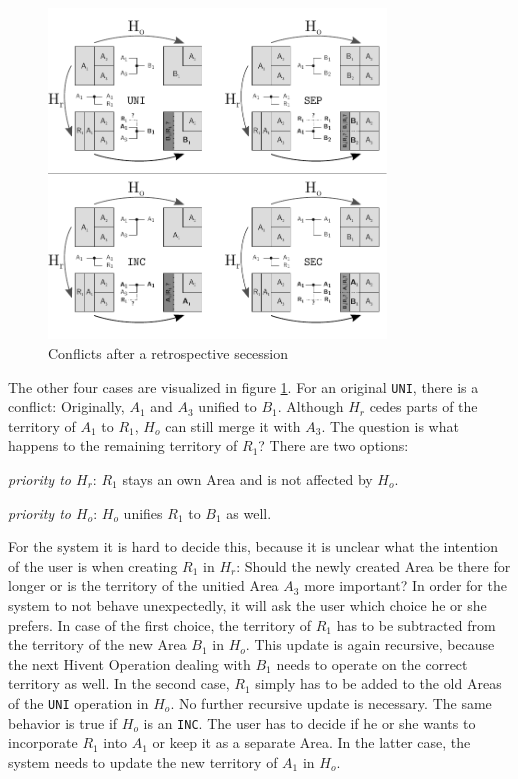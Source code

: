 \begin{figure}[ht]
\vspace{1em}
  \centering
  \includegraphics[width=0.8\textwidth]{graphics/development/editing_hivent_data/retrospective_updates/SEC}
  \caption{Conflicts after a retrospective secession}
  \label{fig:update_conflict_SEC}
\end{figure}

The other four cases are visualized in figure \ref{fig:update_conflict_SEC}. For an original \texttt{UNI}, there is a conflict: Originally, $A_1$ and $A_3$ unified to $B_1$. Although $H_r$ cedes parts of the territory of $A_1$ to $R_1$, $H_o$ can still merge it with $A_3$. The question is what happens to the remaining territory of $R_1$? There are two options:
\begin{compactenum}
  \item
  \emph{priority to $H_r$}:
  $R_1$ stays an own Area and is not affected by $H_o$.
  \item
  \emph{priority to $H_o$}:
  $H_o$ unifies $R_1$ to $B_1$ as well.
\end{compactenum}
For the system it is hard to decide this, because it is unclear what the intention of the user is when creating $R_1$ in $H_r$: Should the newly created Area be there for longer or is the territory of the unitied Area $A_3$ more important? In order for the system to not behave unexpectedly, it will ask the user which choice he or she prefers. In case of the first choice, the territory of $R_1$ has to be subtracted from the territory of the new Area $B_1$ in $H_o$. This update is again recursive, because the next Hivent Operation dealing with $B_1$ needs to operate on the correct territory as well. In the second case, $R_1$ simply has to be added to the old Areas of the \texttt{UNI} operation in $H_o$. No further recursive update is necessary. The same behavior is true if $H_o$ is an \texttt{INC}. The user has to decide if he or she wants to incorporate $R_1$ into $A_1$ or keep it as a separate Area. In the latter case, the system needs to update the new territory of $A_1$ in $H_o$.

